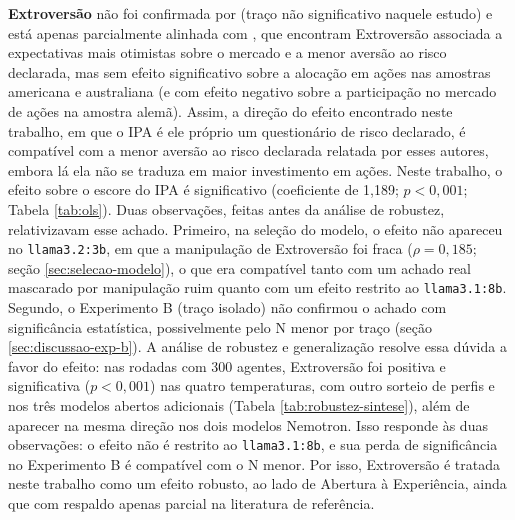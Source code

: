 \textbf{Extroversão} não foi confirmada por 
(traço não significativo naquele estudo) e está apenas parcialmente
alinhada com , que encontram Extroversão
associada a expectativas mais otimistas sobre o mercado e a menor
aversão ao risco declarada, mas sem efeito significativo sobre a
alocação em ações nas amostras americana e australiana (e com efeito
negativo sobre a participação no mercado de ações na amostra alemã).
Assim, a direção do efeito encontrado neste trabalho, em que o IPA é ele
próprio um questionário de risco declarado, é compatível com a menor
aversão ao risco declarada relatada por esses autores, embora lá ela não
se traduza em maior investimento em ações. Neste trabalho, o efeito
sobre o escore do IPA é significativo (coeficiente de 1,189;
$p<0{,}001$; Tabela \ref{tab:ols}). Duas observações, feitas antes da
análise de robustez, relativizavam esse achado. Primeiro, na seleção do
modelo, o efeito não apareceu no \texttt{llama3.2:3b}, em que a
manipulação de Extroversão foi fraca ($\rho=0{,}185$; seção
\ref{sec:selecao-modelo}), o que era
compatível tanto com um achado real mascarado por manipulação ruim quanto
com um efeito restrito ao \texttt{llama3.1:8b}. Segundo, o Experimento B
(traço isolado) não confirmou o achado com significância estatística,
possivelmente pelo N menor por traço (seção \ref{sec:discussao-exp-b}).
A análise de robustez e generalização resolve essa dúvida a favor do
efeito: nas rodadas com 300 agentes, Extroversão foi positiva e
significativa ($p<0{,}001$) nas quatro temperaturas, com outro sorteio de
perfis e nos três modelos abertos adicionais (Tabela
\ref{tab:robustez-sintese}), além de aparecer na mesma direção nos dois
modelos Nemotron. Isso responde às duas observações: o efeito não é
restrito ao \texttt{llama3.1:8b}, e sua perda de significância no
Experimento B é compatível com o N menor. Por isso, Extroversão é tratada
neste trabalho como um efeito robusto, ao lado de Abertura à Experiência,
ainda que com respaldo apenas parcial na literatura de referência.

